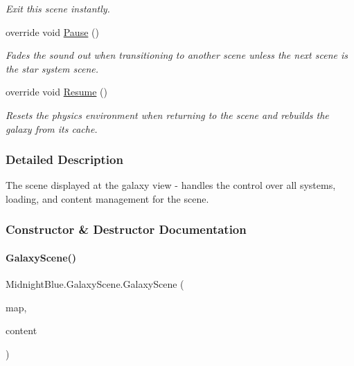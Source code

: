 \begin{DoxyCompactItemize}
\begin{DoxyCompactList}\small\item\em Exit this scene instantly. \end{DoxyCompactList}\item 
override void \hyperlink{class_midnight_blue_1_1_galaxy_scene_aeb44afaeda2cccd225e64908bb76bee4}{Pause} ()
\begin{DoxyCompactList}\small\item\em Fades the sound out when transitioning to another scene unless the next scene is the star system scene. \end{DoxyCompactList}\item 
override void \hyperlink{class_midnight_blue_1_1_galaxy_scene_ab641e6727cdb64dc6487e9a229521692}{Resume} ()
\begin{DoxyCompactList}\small\item\em Resets the physics environment when returning to the scene and rebuilds the galaxy from its cache. \end{DoxyCompactList}\end{DoxyCompactItemize}


\subsubsection{Detailed Description}
The scene displayed at the galaxy view -\/ handles the control over all systems, loading, and content management for the scene. 



\subsubsection{Constructor \& Destructor Documentation}
\hypertarget{class_midnight_blue_1_1_galaxy_scene_acdd82e3464ea18ca77bcf4694e9803a5}{}\label{class_midnight_blue_1_1_galaxy_scene_acdd82e3464ea18ca77bcf4694e9803a5} 
\paragraph{\texorpdfstring{Galaxy\+Scene()}{GalaxyScene()}}
{\footnotesize\ttfamily Midnight\+Blue.\+Galaxy\+Scene.\+Galaxy\+Scene (\begin{DoxyParamCaption}\item[{Entity\+Map}]{map,  }\item[{Content\+Manager}]{content }\end{DoxyParamCaption})\hspace{0.3cm}{\ttfamily [inline]}}



